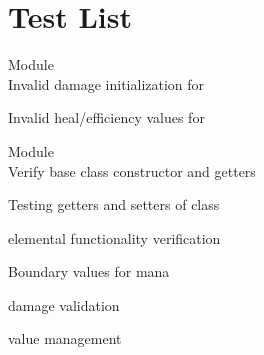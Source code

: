 \chapter{Test List}
\hypertarget{test}{}\label{test}

\begin{DoxyRefList}
\item[Module \doxylink{group__ErrorHandling}{Error\+Handling} ]\hfill \\
\label{test__test000006}%
%
Invalid damage initialization for   



\label{test__test000008}%
%
Invalid heal/efficiency values for   


\item[Module \doxylink{group__GCI}{GCI} ]\hfill \\
\label{test__test000001}%
%
Verify base  class constructor and getters  



\label{test__test000002}%
%
Testing getters and setters of  class  



\label{test__test000003}%
%
 elemental functionality verification  



\label{test__test000004}%
%
Boundary values for  mana  



\label{test__test000005}%
%
 damage validation  



\label{test__test000007}%
%
 value management  


\end{DoxyRefList}